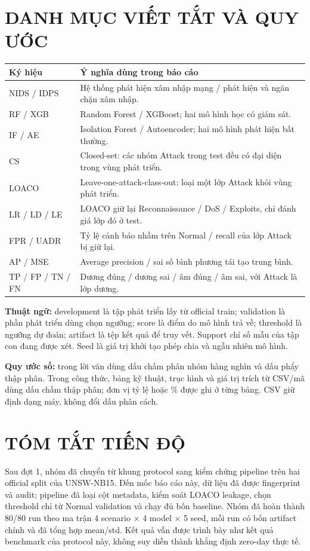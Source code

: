 \documentclass[12pt,a4paper,oneside]{report}
\begin{document}
\chapter*{DANH MỤC VIẾT TẮT VÀ QUY ƯỚC}
\begingroup\small\renewcommand{\arraystretch}{1.2}
\noindent\begin{tabularx}{\textwidth}{L{2.8cm}Y}\toprule
Ký hiệu & Ý nghĩa dùng trong báo cáo\\\midrule
NIDS / IDPS & Hệ thống phát hiện xâm nhập mạng / phát hiện và ngăn chặn xâm nhập.\\
RF / XGB & Random Forest / XGBoost; hai mô hình học có giám sát.\\
IF / AE & Isolation Forest / Autoencoder; hai mô hình phát hiện bất thường.\\
CS & Closed-set: các nhóm Attack trong test đều có đại diện trong vùng phát triển.\\
LOACO & Leave-one-attack-class-out: loại một lớp Attack khỏi vùng phát triển.\\
LR / LD / LE & LOACO giữ lại Reconnaissance / DoS / Exploits, chỉ đánh giá lớp đó ở test.\\
FPR / UADR & Tỷ lệ cảnh báo nhầm trên Normal / recall của lớp Attack bị giữ lại.\\
AP / MSE & Average precision / sai số bình phương tái tạo trung bình.\\
TP / FP / TN / FN & Dương đúng / dương sai / âm đúng / âm sai, với Attack là lớp dương.\\
\bottomrule\end{tabularx}\endgroup

\textbf{Thuật ngữ:} development là tập phát triển lấy từ official train; validation là phần phát triển dùng chọn ngưỡng; score là điểm do mô hình trả về; threshold là ngưỡng dự đoán; artifact là tệp kết quả để truy vết. Support chỉ số mẫu của tập con đang được xét. Seed là giá trị khởi tạo phép chia và ngẫu nhiên mô hình.

\textbf{Quy ước số:} trong lời văn dùng dấu chấm phân nhóm hàng nghìn và dấu phẩy thập phân. Trong công thức, bảng kỹ thuật, trục hình và giá trị trích từ CSV/mã dùng dấu chấm thập phân; đơn vị tỷ lệ hoặc \% được ghi ở từng bảng. CSV giữ định dạng máy, không đổi dấu phân cách.
\clearpage
\chapter*{TÓM TẮT TIẾN ĐỘ}
Sau đợt 1, nhóm đã chuyển từ khung protocol sang kiểm chứng pipeline trên hai official split của UNSW-NB15. Đến mốc báo cáo này, dữ liệu đã được fingerprint và audit; pipeline đã loại cột metadata, kiểm soát LOACO leakage, chọn threshold chỉ từ Normal validation và chạy đủ bốn baseline. Nhóm đã hoàn thành 80/80 run theo ma trận 4 scenario $\times$ 4 model $\times$ 5 seed, mỗi run có bốn artifact chính và đã tổng hợp mean/std. Kết quả vẫn được trình bày như kết quả benchmark của protocol này, không suy diễn thành khẳng định zero-day thực tế.
\end{document}

